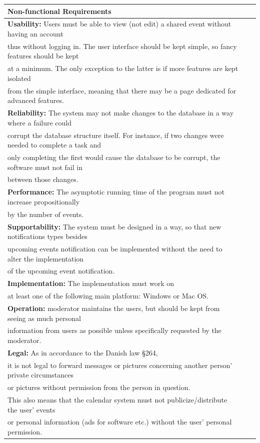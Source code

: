 \documentclass[a4paper]{article}
\begin{document}
\begin{tabular}{l r @{} l}
	\textbf{Non-functional Requirements}\\
	\hline
	\textbf{Usability:} Users must be able to view (not edit) a shared event without having an account\\
	 thus without logging in. The user interface should be kept simple, so fancy features should be kept\\
	 at a minimum. The only exception to the latter is if more features are kept isolated\\ 
	 from the simple interface, meaning that there may be a page dedicated for advanced features.\\
	\hline
	\textbf{Reliability:} The system may not make changes to the database in a way where a failure could\\
	 corrupt the database structure itself. For instance, if two changes were needed to complete a task and\\
	 only completing the first would cause the database to be corrupt, the software must not fail in\\
	 between those changes.\\
	\hline
	\textbf{Performance:} The asymptotic running time of the program must not increase propositionally\\
	by the number of events.\\
	\hline
	\textbf{Supportability:} The system must be designed in a way, so that new notifications types besides\\
	upcoming events notification can be implemented without the need to alter the implementation\\
	of the upcoming event notification.\\
	\hline
	\textbf{Implementation:} The implementation must work on\\
	at least one of the following main platform: Windows or Mac OS.\\
	\hline
	\textbf{Operation:} moderator maintains the users, but should be kept from seeing as much personal\\
	 information from users as possible unless specifically requested by the moderator.\\
	\hline
	\textbf{Legal:}  As in accordance to the Danish law \S 264,\\
	 it is not legal to forward messages or pictures concerning another person’ private circumstances\\
	 or pictures without permission from the person in question.\\ 
	This also means that the calendar system must not publicize/distribute the user’ events\\
	 or personal information (ads for software etc.) without the user’ personal permission.\\
	\hline
\end{tabular}
\end{document}

